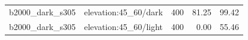 \begin{longtable}{l>{\raggedright\arraybackslash}p{.42\linewidth}rrr}
b2000\_\allowbreak{}dark\_\allowbreak{}s305 & %
elevation:45\_\allowbreak{}60/dark & %
400 & %
81.25 & %
99.42 \\ %

b2000\_\allowbreak{}dark\_\allowbreak{}s305 & %
elevation:45\_\allowbreak{}60/light & %
400 & %
0.00 & %
55.46 \\ %


\end{longtable}
